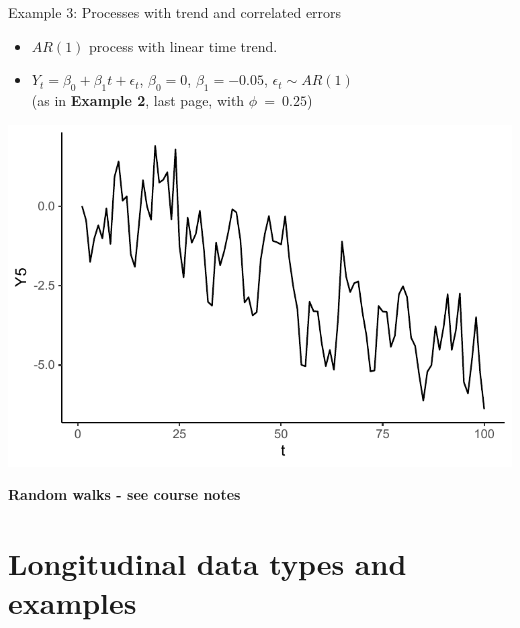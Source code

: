 \documentclass[
  9pt,
  ignorenonframetext,
]{beamer}
\providecommand{\tightlist}{%
  \setlength{\itemsep}{0pt}\setlength{\parskip}{0pt}}
\begin{document}
\begin{frame}{}
\protect\hypertarget{section-2}{}
\begin{block}{Example 3: Processes with trend and correlated errors}
\protect\hypertarget{example-3-processes-with-trend-and-correlated-errors}{}
\begin{itemize}
\tightlist
\item
  \(AR(1)\) process with linear time trend.
\item
  \(Y_t = \beta_0 + \beta_1t + \epsilon_t\), \(\beta_0 = 0\),
  \(\beta_1 = -0.05\), \(\epsilon_t \sim AR(1)\)\\
  (as in \textbf{Example 2}, last page, with \(\phi\ =\ 0.25\))
\end{itemize}

\tiny

\begin{center}\includegraphics[width=0.5\linewidth]{figs_L1/linear_time_trend-1} \end{center}

\tiny

\textbf{Random walks - see course notes}
\end{block}
\end{frame}

\hypertarget{longitudinal-data-types-and-examples}{%
\section{Longitudinal data types and
examples}\label{longitudinal-data-types-and-examples}}
\end{document}
